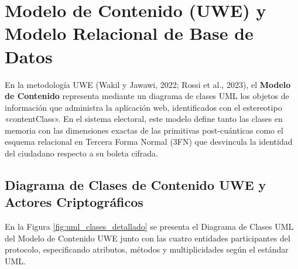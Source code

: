 \section{Modelo de Contenido (UWE) y Modelo Relacional de Base de Datos}
\label{sec:diagrama_clases_detallado}
\label{sec:diseno_bbdd}

En la metodología UWE (Wakil y Jawawi, 2022; Rossi et al., 2023), el \textbf{Modelo de Contenido} representa mediante un diagrama de clases UML los objetos de información que administra la aplicación web, identificados con el estereotipo «contentClass». En el sistema electoral, este modelo define tanto las clases en memoria con las dimensiones exactas de las primitivas post-cuánticas como el esquema relacional en Tercera Forma Normal (3FN) que desvincula la identidad del ciudadano respecto a su boleta cifrada.

\subsection{Diagrama de Clases de Contenido UWE y Actores Criptográficos}

En la Figura \ref{fig:uml_clases_detallado} se presenta el Diagrama de Clases UML del Modelo de Contenido UWE junto con las cuatro entidades participantes del protocolo, especificando atributos, métodos y multiplicidades según el estándar UML.

